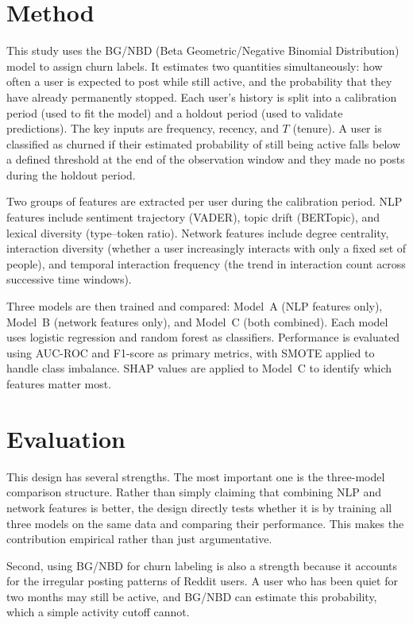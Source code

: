 \documentclass[12pt]{article}
\begin{document}
\section{Method}

This study uses the BG/NBD (Beta Geometric/Negative Binomial Distribution) model to assign churn labels. It estimates two quantities simultaneously: how often a user is expected to post while still active, and the probability that they have already permanently stopped. Each user's history is split into a calibration period (used to fit the model) and a holdout period (used to validate predictions). The key inputs are frequency, recency, and $T$ (tenure). A user is classified as churned if their estimated probability of still being active falls below a defined threshold  at the end of the observation window and they made no posts during the holdout period.

Two groups of features are extracted per user during the calibration period. NLP features include sentiment trajectory (VADER), topic drift (BERTopic), and lexical diversity (type--token ratio). Network features include degree centrality, interaction diversity (whether a user increasingly interacts with only a fixed set of people), and temporal interaction frequency (the trend in interaction count across successive time windows).

Three models are then trained and compared: Model~A (NLP features only), Model~B (network features only), and Model~C (both combined). Each model uses logistic regression and random forest as classifiers. Performance is evaluated using  AUC-ROC and F1-score as primary metrics, with SMOTE applied to handle class imbalance. SHAP values are applied to Model~C to identify which features matter most.

\section{Evaluation}

This design has several strengths. The most important one is the three-model comparison structure. Rather than simply claiming that combining NLP and network features is better, the design directly tests whether it is by training all three models on the same data and comparing their performance. This makes the contribution empirical rather than just argumentative. 

Second, using BG/NBD for churn labeling is also a strength because it accounts for the irregular posting patterns of Reddit users. A user who has been quiet for two months may still be active, and BG/NBD can estimate this probability, which a simple activity cutoff cannot.
\end{document}
